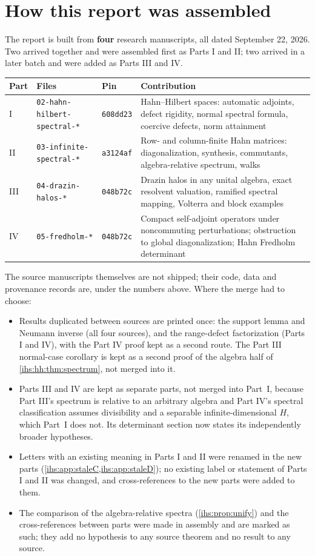 \documentclass[11pt,a4paper]{article}
\numberwithin{equation}{section}
\theoremstyle{definition}
\theoremstyle{remark}
\begin{document}
\section{How this report was assembled}\label{ihs:app:provenance}
The report is built from \textbf{four} research manuscripts, all dated
September 22, 2026. Two arrived together and were assembled first as Parts
I and II; two arrived in a later batch and were added as Parts III and IV.
\begin{center}\small
\begin{tabularx}{\textwidth}{@{}p{}p{}p{}Y@{}}
\toprule
Part & Files & Pin & Contribution\\
\midrule
I & \texttt{02-hahn-hilbert-spectral-*} & \texttt{608dd23} & Hahn--Hilbert spaces: automatic adjoints, defect rigidity, normal spectral formula, coercive defects, norm attainment\\
II & \texttt{03-infinite-spectral-*} & \texttt{a3124af} & Row- and column-finite Hahn matrices: diagonalization, synthesis, commutants, algebra-relative spectrum, walks\\
III & \texttt{04-drazin-halos-*} & \texttt{048b72c} & Drazin halos in any unital algebra, exact resolvent valuation, ramified spectral mapping, Volterra and block examples\\
IV & \texttt{05-fredholm-*} & \texttt{048b72c} & Compact self-adjoint operators under noncommuting perturbations; obstruction to global diagonalization; Hahn Fredholm determinant\\
\bottomrule
\end{tabularx}
\end{center}
The source manuscripts themselves are not shipped; their code, data and
provenance records are, under the numbers above. Where the merge had to
choose:
\begin{itemize}
\item Results duplicated between sources are printed once: the support
 lemma and Neumann inverse (all four sources), and the range-defect
 factorization (Parts I and IV), with the Part IV proof kept as a second
 route. The Part III normal-case corollary is kept as a second proof of the
 algebra half of \cref{ihs:hh:thm:spectrum}, not merged into it.
\item Parts III and IV are kept as separate parts, not merged into Part~I,
 because Part III's spectrum is relative to an arbitrary algebra and Part IV's
 spectral classification assumes divisibility and a separable
 infinite-dimensional $H$, which Part~I does not. Its determinant section
 now states its independently broader hypotheses.
\item Letters with an existing meaning in Parts I and II were renamed in the
 new parts (\cref{ihs:app:staleC,ihs:app:staleD}); no existing label or
 statement of Parts I and II was changed, and cross-references to the new
 parts were added to them.
\item The comparison of the algebra-relative spectra (\cref{ihs:prop:unify})
 and the cross-references between parts were made in assembly and are
 marked as such; they add no hypothesis to any source theorem and no result
 to any source.
\end{itemize}
\end{document}

